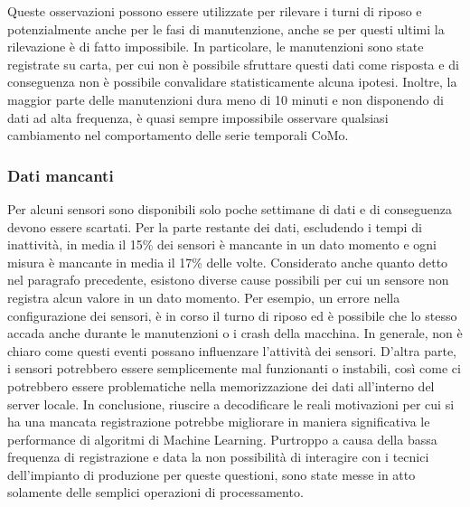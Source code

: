 Queste osservazioni possono essere utilizzate per rilevare i turni di riposo e potenzialmente anche per le fasi di manutenzione, anche se per questi ultimi la rilevazione è di fatto impossibile. In particolare, le manutenzioni sono state registrate su carta, per cui non è possibile sfruttare questi dati come risposta e di conseguenza non è possibile convalidare statisticamente alcuna ipotesi.
Inoltre, la maggior parte delle manutenzioni dura meno di 10 minuti e
non disponendo di dati ad alta frequenza, è quasi sempre impossibile
osservare qualsiasi cambiamento nel comportamento delle serie temporali CoMo. 

\subsubsection{Dati mancanti}
Per alcuni sensori sono disponibili solo poche settimane di dati e di conseguenza devono essere scartati. Per la parte restante dei dati, escludendo i tempi di inattività, in media il 15\% dei sensori è mancante in un dato momento e ogni misura è mancante in media il 17\% delle volte. Considerato anche quanto detto nel paragrafo precedente, esistono diverse cause possibili per cui un sensore non registra alcun valore in un dato momento. Per esempio, un errore nella configurazione dei sensori, è in corso il turno di riposo ed è possibile che lo stesso accada anche durante le manutenzioni o i crash della macchina.
In generale, non è chiaro come questi eventi possano influenzare l'attività dei sensori. D'altra parte, i sensori potrebbero essere semplicemente mal funzionanti o instabili, così come ci potrebbero essere problematiche nella memorizzazione dei dati all'interno del server locale. 
In conclusione, riuscire a decodificare le reali motivazioni per cui si ha una mancata registrazione potrebbe migliorare in maniera significativa le performance di algoritmi di Machine Learning. Purtroppo a causa della bassa frequenza di registrazione e data la non possibilità di interagire con i tecnici dell'impianto di produzione per queste questioni, sono state messe in atto solamente delle semplici operazioni di processamento.


